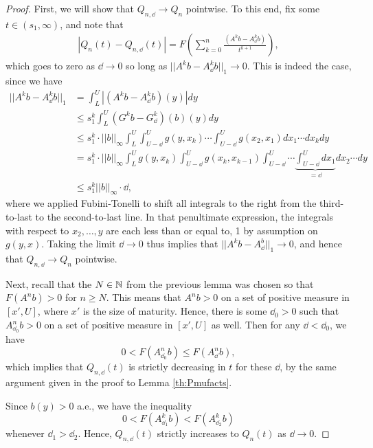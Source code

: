 \begin{proof}
	First, we will show that $Q_{n, \dd} \to Q_n$ pointwise. To this end, fix some $t \in (s_1, \infty)$, and note that
	\begin{align*}
		|Q_n(t) - Q_{n, \dd}(t)| = F \left( \sum_{k=0}^n \frac{(A^k b - A_\dd^k b)}{t^{k + 1}} \right),
	\end{align*}
	which goes to zero  as $\dd \to 0$ so long as $||A^k b - A_\dd^k b||_1 \to 0$. This is indeed the case, since we have
	\begin{align*}
		||A^k b - A_\dd^k b||_1 & = \int_L^U \left| (A^k b - A^k_\dd b)(y) \right| dy \\
		&\leq s_1^k \int_L^U (G^kb - G^k_\dd)(b)(y) dy \\
		&\leq s_1^k \cdot ||b||_\infty \int_L^U \int_{U - \dd}^U g(y, x_k) \cdots \int_{U - \dd}^U g(x_2, x_1) dx_1 \cdots dx_k dy \\
		&= s_1^k \cdot ||b||_\infty \int_L^U g(y, x_k) \int_{U - \dd}^U g(x_k, x_{k - 1}) \int_{U-\dd}^U \cdots \underbrace{\int_{U-\dd}^U dx_1}_{= \dd} dx_2 \cdots dy \\
		&\leq s_1^k ||b||_\infty \cdot \dd,
	\end{align*}
	where we applied Fubini-Tonelli to shift all integrals to the right from the third-to-last to the second-to-last line. In that penultimate expression, the integrals with respect to $x_2, \ldots, y$ are each less than or equal to, 1 by assumption on $g(y, x)$. Taking the limit $\dd \to 0$ thus implies that $||A^kb - A_\dd^b||_1 \to 0$, and hence that $Q_{n, \dd} \to Q_n$ pointwise.
	
	Next, recall that the $N \in \mathbb{N}$ from the previous lemma was chosen so that $F(A^n b) > 0$ for $n \geq N$. This means that $A^n b >0 $ on a set of positive measure in $[x', U]$, where $x'$ is the size of maturity. Hence, there is some $\dd_0>0$ such that $A^n_{\dd_0}b >0$ on a set of positive measure in $[x', U]$ as well. Then for any $\dd < \dd_0$, we have
	\[0 < F(A^n_{\dd_0} b) \leq F(A^n_{\dd} b),\]
	which implies that $Q_{n, \dd}(t)$ is strictly decreasing in $t$ for these $\dd$, by the same argument given in the proof to Lemma \ref{th:Pmufacts}.
	
	Since $b(y) > 0 $ a.e., we have the inequality
	\[0 < F(A_{\dd_1}^k b) < F(A_{\dd_2}^k b)\]
	whenever $\dd_1 > \dd_2$. Hence, $Q_{n, \dd}(t)$ strictly increases to $Q_n(t)$ as $\dd \to 0$.
	

\end{proof}

